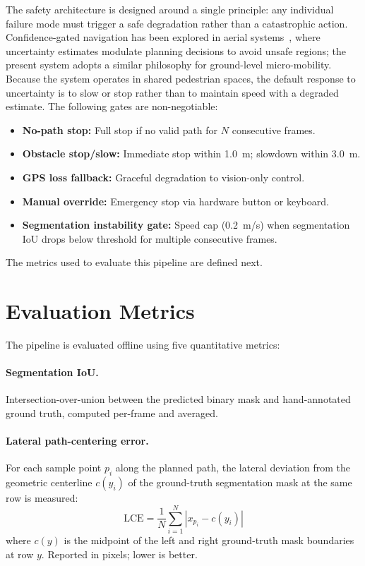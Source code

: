 \documentclass[12pt,letterpaper,oneside]{report}
\begin{document}
The safety architecture is designed around a single principle: any individual failure mode must trigger a safe degradation rather than a catastrophic action. Confidence-gated navigation has been explored in aerial systems~\cite{richter2017safe}, where uncertainty estimates modulate planning decisions to avoid unsafe regions; the present system adopts a similar philosophy for ground-level micro-mobility. Because the system operates in shared pedestrian spaces, the default response to uncertainty is to slow or stop rather than to maintain speed with a degraded estimate. The following gates are non-negotiable:

\begin{itemize}[nosep]
  \item \textbf{No-path stop:} Full stop if no valid path for $N$ consecutive frames.
  \item \textbf{Obstacle stop/slow:} Immediate stop within \SI{1.0}{m}; slowdown within \SI{3.0}{m}.
  \item \textbf{GPS loss fallback:} Graceful degradation to vision-only control.
  \item \textbf{Manual override:} Emergency stop via hardware button or keyboard.
  \item \textbf{Segmentation instability gate:} Speed cap (\SI{0.2}{m/s}) when segmentation IoU drops below threshold for multiple consecutive frames.
\end{itemize}

The metrics used to evaluate this pipeline are defined next.


\section{Evaluation Metrics}
\label{sec:metrics}

The pipeline is evaluated offline using five quantitative metrics:

\paragraph{Segmentation IoU.}
Intersection-over-union between the predicted binary mask and hand-annotated ground truth, computed per-frame and averaged.

\paragraph{Lateral path-centering error.}
For each sample point $p_i$ along the planned path, the lateral deviation from the geometric centerline $c(y_i)$ of the ground-truth segmentation mask at the same row is measured:
\begin{equation}
\text{LCE} = \frac{1}{N} \sum_{i=1}^{N} |x_{p_i} - c(y_i)|
\end{equation}
where $c(y)$ is the midpoint of the left and right ground-truth mask boundaries at row $y$.  Reported in pixels; lower is better.
\end{document}
